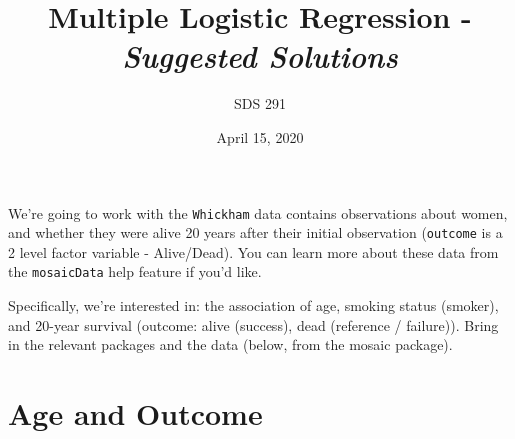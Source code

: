 \documentclass[]{article}
\title{Multiple Logistic Regression - \emph{Suggested Solutions}}
\author{SDS 291}
\date{April 15, 2020}
\newenvironment{Shaded}{\begin{snugshade}}{\end{snugshade}}
\newcommand{\DataTypeTok}[1]{\textcolor[rgb]{0.13,0.29,0.53}{#1}}
\newcommand{\KeywordTok}[1]{\textcolor[rgb]{0.13,0.29,0.53}{\textbf{#1}}}
\newcommand{\NormalTok}[1]{#1}
\newcommand{\OperatorTok}[1]{\textcolor[rgb]{0.81,0.36,0.00}{\textbf{#1}}}
\newcommand{\StringTok}[1]{\textcolor[rgb]{0.31,0.60,0.02}{#1}}
\begin{document}
\maketitle

We're going to work with the \texttt{Whickham} data contains
observations about women, and whether they were alive 20 years after
their initial observation (\texttt{outcome} is a 2 level factor variable
- Alive/Dead). You can learn more about these data from the
\texttt{mosaicData} help feature if you'd like.

Specifically, we're interested in: the association of age, smoking
status (smoker), and 20-year survival (outcome: alive (success), dead
(reference / failure)). Bring in the relevant packages and the data
(below, from the mosaic package).

\begin{Shaded}
\end{Shaded}

\newpage

\hypertarget{age-and-outcome}{%
\section{Age and Outcome}\label{age-and-outcome}}
\end{document}
